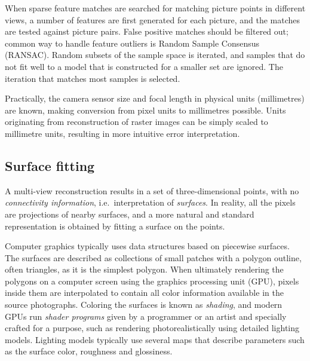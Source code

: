 
When sparse feature matches are searched for matching picture points in different views, a number of features are first generated for each picture, and the matches are tested against picture pairs.
False positive matches should be filtered out; common way to handle feature outliers is Random Sample Consensus (RANSAC).
Random subsets of the sample space is iterated, and samples that do not fit well to a model that is constructed for a smaller set are ignored.
The iteration that matches most samples is selected. \cite{hartley03multiview}


Practically, the camera sensor size and focal length in physical units (millimetres) are known, making conversion from pixel units to millimetres possible.
Units originating from reconstruction of raster images can be simply scaled to millimetre units, resulting in more intuitive error interpretation.




\subsection{Surface fitting} %

A multi-view reconstruction results in a set of three-dimensional points, with no \emph{connectivity information}, i.e.\ interpretation of \emph{surfaces}.
In reality, all the pixels are projections of nearby surfaces, and a more natural and standard representation is obtained by fitting a surface on the points.

Computer graphics typically uses data structures based on piecewise surfaces.
The surfaces are described as collections of small patches with a polygon outline, often triangles, as it is the simplest polygon.
When ultimately rendering the polygons on a computer screen using the graphics processing unit (GPU), pixels inside them are interpolated to contain all color information available in the source photographs.
Coloring the surfaces is known as \emph{shading}, and modern GPUs run \emph{shader programs} given by a programmer or an artist and specially crafted for a purpose, such as rendering photorealistically using detailed lighting models.
Lighting models typically use several maps that describe parameters such as the surface color, roughness and glossiness.

